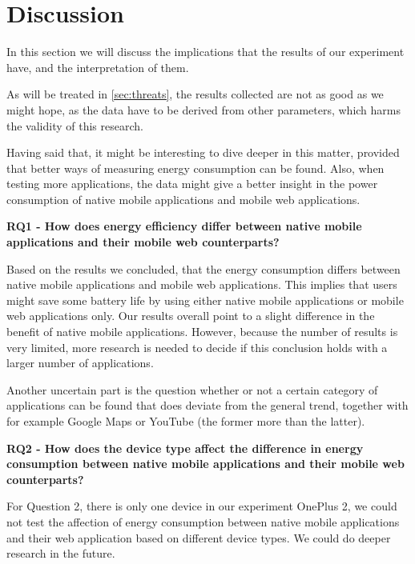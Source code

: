 \section{Discussion}\label{sec:discussion}
In this section we will discuss the implications that the results of our experiment have, and the interpretation of them.

As will be treated in \autoref{sec:threats}, the results collected are not as good as we might hope, as the data have to be derived from other parameters, which harms the validity of this research.

Having said that, it might be interesting to dive deeper in this matter, provided that better ways of measuring energy consumption can be found. Also, when testing more applications, the data might give a better insight in the power consumption of native mobile applications and mobile web applications.

\textbf{RQ1 - How does energy efficiency differ between native mobile applications and their mobile web counterparts?}

Based on the results we concluded, that the energy consumption differs between native mobile applications and mobile web applications. This implies that users might save some battery life by using either native mobile applications or mobile web applications only. Our results overall point to a slight difference in the benefit of native mobile applications. However, because the number of results is very limited, more research is needed to decide if this conclusion holds with a larger number of applications.

Another uncertain part is the question whether or not a certain category of applications can be found that does deviate from the general trend, together with for example Google Maps or YouTube (the former more than the latter). 

\textbf{RQ2 - How does the device type affect the difference in energy consumption between native mobile applications and their mobile web counterparts?}

For Question 2, there is only one device in our experiment OnePlus 2, we could not test the affection of energy consumption between native mobile applications and their web application based on different device types. We could do deeper research in the future.
